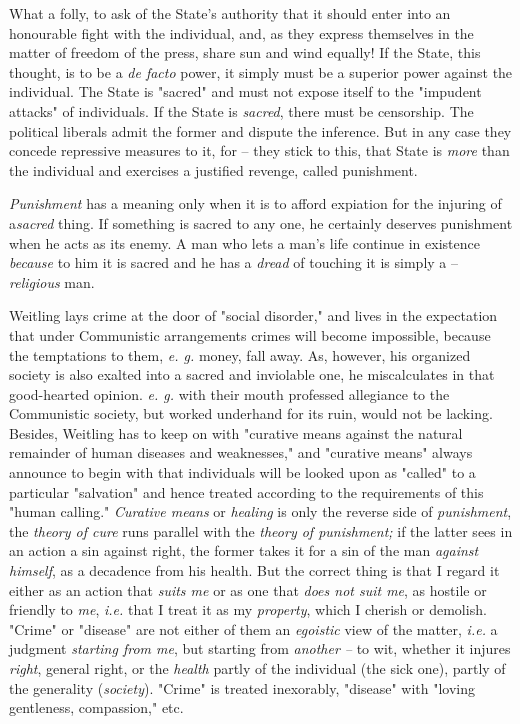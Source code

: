\documentclass[a4paper]{book}
\begin{document}
What a folly, to ask of the State's authority that it should enter into an 
honourable fight with the individual, and, as they express themselves in the 
matter of freedom of the press, share sun and wind equally! If the State, this 
thought, is to be a \textit{de facto} power, it simply must be a superior 
power against the individual. The State is "{}sacred"{} and must not expose 
itself to the "{}impudent attacks"{} of individuals. If the State is 
\textit{sacred}, there must be censorship. The political liberals admit the 
former and dispute the inference. But in any case they concede repressive 
measures to it, for -- they stick to this, that State is \textit{more} than 
the individual and exercises a justified revenge, called punishment.

\textit{Punishment} has a meaning only when it is to afford expiation for the 
injuring of a\textit{sacred} thing. If something is sacred to any one, he 
certainly deserves punishment when he acts as its enemy. A man who lets a 
man's life continue in existence \textit{because} to him it is sacred and he 
has a \textit{dread} of touching it is simply a -- \textit{religious} man.

Weitling lays crime at the door of "{}social disorder,"{} and lives in the 
expectation that under Communistic arrangements crimes will become impossible, 
because the temptations to them, \textit{e. g.} money, fall away. As, however, 
his organized society is also exalted into a sacred and inviolable one, he 
miscalculates in that good-hearted opinion. \textit{e. g.} with their mouth 
professed allegiance to the Communistic society, but worked underhand for its 
ruin, would not be lacking. Besides, Weitling has to keep on with "{}curative 
means against the natural remainder of human diseases and weaknesses,"{} and 
"{}curative means"{} always announce to begin with that individuals will be 
looked upon as "{}called"{} to a particular "{}salvation"{} and hence treated 
according to the requirements of this "{}human calling."{} \textit{Curative 
means} or \textit{healing} is only the reverse side of \textit{punishment}, 
the \textit{theory of cure} runs parallel with the \textit{theory of 
punishment;} if the latter sees in an action a sin against right, the former 
takes it for a sin of the man \textit{against himself}, as a decadence from 
his health. But the correct thing is that I regard it either as an action that 
\textit{suits me} or as one that \textit{does not suit me}, as hostile or 
friendly to \textit{me}, \textit{i.e.} that I treat it as my 
\textit{property}, which I cherish or demolish. "{}Crime"{} or "{}disease"{} 
are not either of them an \textit{egoistic} view of the matter, \textit{i.e.} 
a judgment \textit{starting from me}, but starting from \textit{another --} to 
wit, whether it injures \textit{right}, general right, or the \textit{health} 
partly of the individual (the sick one), partly of the generality 
(\textit{society}). "{}Crime"{} is treated inexorably, "{}disease"{} with 
"{}loving gentleness, compassion,"{} etc.
\end{document}
